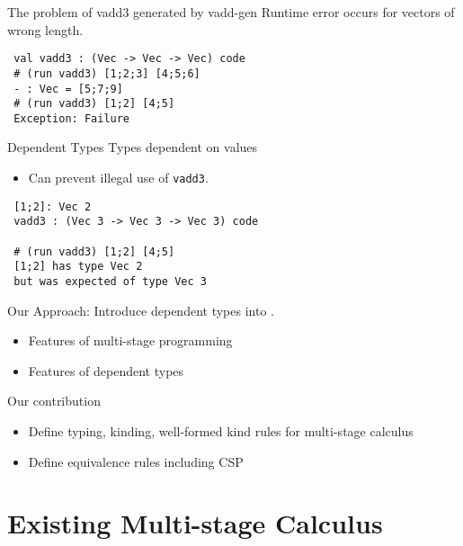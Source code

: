 \documentclass[dvipdfmx,aspectratio=169, 20pt]{beamer}
\renewcommand{\V}{\vdash}
\begin{document}
\begin{frame}[fragile]{The problem of vadd3 generated by vadd-gen}
    Runtime error occurs for vectors of wrong length.
    \begin{verbatim}
 val vadd3 : (Vec -> Vec -> Vec) code
 # (run vadd3) [1;2;3] [4;5;6]
 - : Vec = [5;7;9]
 # (run vadd3) [1;2] [4;5]
 Exception: Failure
    \end{verbatim}
    \note{
    }
\end{frame}

\begin{frame}[fragile]{Dependent Types}
    \renewcommand{\V}{\text{Vec}\ }
    Types dependent on values
    \begin{itemize}
        \item Can prevent illegal use of {\verb|vadd3|}.
    \end{itemize}
 \begin{verbatim}
 [1;2]: Vec 2
 vadd3 : (Vec 3 -> Vec 3 -> Vec 3) code

 # (run vadd3) [1;2] [4;5]
 [1;2] has type Vec 2
 but was expected of type Vec 3
 \end{verbatim}
\end{frame}

\begin{frame}[fragile]{Our Approach: \LMD}
    Introduce dependent types into .
    \begin{itemize}
        \item Features of multi-stage programming
        \item Features of dependent types
    \end{itemize}
    Our contribution
    \begin{itemize}
        \item Define typing, kinding, well-formed kind rules for multi-stage calculus
        \item Define equivalence rules including CSP
    \end{itemize}
\end{frame}

\section{Existing Multi-stage Calculus \LTP}
\end{document}
